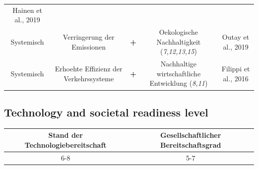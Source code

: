 \documentclass[
]{book}
\begin{document}
\begin{longtable}[]{@{}ccccc@{}}
\begin{minipage}[t]{0.17\columnwidth}
Hainen et al., 2019\strut
\end{minipage}\tabularnewline
\begin{minipage}[t]{0.17\columnwidth}\centering
Systemisch\strut
\end{minipage} & \begin{minipage}[t]{0.16\columnwidth}\centering
Verringerung der Emissionen\strut
\end{minipage} & \begin{minipage}[t]{0.17\columnwidth}\centering
\textbf{+}\strut
\end{minipage} & \begin{minipage}[t]{0.17\columnwidth}\centering
Oekologische Nachhaltigkeit (\emph{7,12,13,15})\strut
\end{minipage} & \begin{minipage}[t]{0.17\columnwidth}\centering
Outay et al., 2019\strut
\end{minipage}\tabularnewline
\begin{minipage}[t]{0.17\columnwidth}\centering
Systemisch\strut
\end{minipage} & \begin{minipage}[t]{0.16\columnwidth}\centering
Erhoehte Effizienz der Verkehrssysteme\strut
\end{minipage} & \begin{minipage}[t]{0.17\columnwidth}\centering
\textbf{+}\strut
\end{minipage} & \begin{minipage}[t]{0.17\columnwidth}\centering
Nachhaltige wirtschaftliche Entwicklung (\emph{8,11})\strut
\end{minipage} & \begin{minipage}[t]{0.17\columnwidth}\centering
Filippi et al., 2016\strut
\end{minipage}\tabularnewline
\bottomrule
\end{longtable}

\hypertarget{technology-and-societal-readiness-level}{%
\subsection*{Technology and societal readiness level}\label{technology-and-societal-readiness-level}}

\begin{longtable}[]{@{}cc@{}}
\toprule
Stand der Technologiebereitschaft & Gesellschaftlicher Bereitschaftsgrad\tabularnewline
\midrule
\endhead
6-8 & 5-7\tabularnewline
\bottomrule
\end{longtable}
\end{document}
